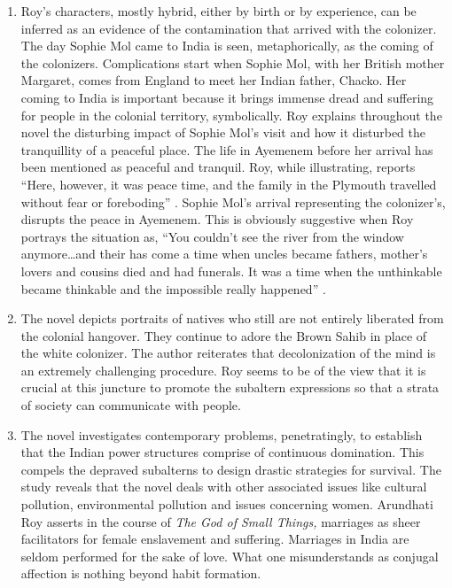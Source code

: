 \begin{enumerate}
  \item Roy's characters, mostly hybrid, either by birth or by experience, can be inferred as an evidence of the contamination that arrived with the colonizer. The day Sophie Mol came to India is seen, metaphorically, as the coming of the colonizers. Complications start when Sophie Mol, with her British mother Margaret, comes from England to meet her Indian father, Chacko. Her coming to India is important because it brings immense dread and suffering for people in the colonial territory, symbolically. Roy explains throughout the novel the disturbing impact of Sophie Mol's visit and how it disturbed the tranquillity of a peaceful place. The life in Ayemenem before her arrival has been mentioned as peaceful and tranquil. Roy, while illustrating, reports ``Here, however, it was peace time, and the family in the Plymouth travelled without fear or foreboding'' \parencite[35]{Roy1997}. Sophie Mol's arrival representing the colonizer's, disrupts the peace in Ayemenem. This is obviously suggestive when Roy portrays the situation as, ``You couldn't see the river from the window anymore\ldots and their has come a time when uncles became fathers, mother's lovers and cousins died and had funerals. It was a time when the unthinkable became thinkable and the impossible really happened'' \parencite[31]{Roy1997}. 

  \item The novel depicts portraits of natives who still are not entirely liberated from the colonial hangover. They continue to adore the Brown Sahib in place of the white colonizer. The author reiterates that decolonization of the mind is an extremely challenging procedure. Roy seems to be of the view that it is crucial at this juncture to promote the subaltern expressions so that a strata of society can communicate with people.

  \item The novel investigates contemporary problems, penetratingly, to establish that the Indian power structures comprise of continuous domination. This compels the depraved subalterns to design drastic strategies for survival. The study reveals that the novel deals with other associated issues like cultural pollution, environmental pollution and issues concerning women. Arundhati Roy asserts in the course of \emph{The God of Small Things,} marriages as sheer facilitators for female enslavement and suffering. Marriages in India are seldom performed for the sake of love. What one misunderstands as conjugal affection is nothing beyond habit formation.


\end{enumerate}
